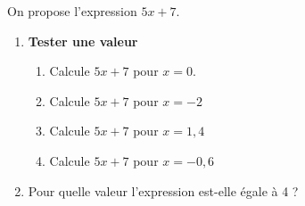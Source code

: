 
On propose l'expression $5x+7$.

\begin{enumerate}
\item \textbf{Tester une valeur}
\begin{enumerate}
\item Calcule $5x+7$ pour $x=0$.
\item Calcule $5x+7$ pour $x=-2$
\item Calcule $5x+7$ pour $x=1,4$
\item Calcule $5x+7$ pour $x=-0,6$
\end{enumerate}
\item Pour quelle valeur l'expression est-elle égale à 4 ?
\end{enumerate}